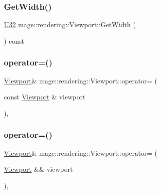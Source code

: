 \subsubsection{\texorpdfstring{Get\+Width()}{GetWidth()}}
{\footnotesize\ttfamily \hyperlink{namespacemage_a41c104c036fba3756a74e19f793eeaa1}{U32} mage\+::rendering\+::\+Viewport\+::\+Get\+Width (\begin{DoxyParamCaption}{ }\end{DoxyParamCaption}) const\hspace{0.3cm}{\ttfamily [noexcept]}}

\hypertarget{classmage_1_1rendering_1_1_viewport_afc42613270537b92aa837455b4c154f0}{}\label{classmage_1_1rendering_1_1_viewport_afc42613270537b92aa837455b4c154f0} 
\subsubsection{\texorpdfstring{operator=()}{operator=()}\hspace{0.1cm}{\footnotesize\ttfamily [1/2]}}
{\footnotesize\ttfamily \hyperlink{classmage_1_1rendering_1_1_viewport}{Viewport}\& mage\+::rendering\+::\+Viewport\+::operator= (\begin{DoxyParamCaption}\item[{const \hyperlink{classmage_1_1rendering_1_1_viewport}{Viewport} \&}]{viewport }\end{DoxyParamCaption})\hspace{0.3cm}{\ttfamily [default]}, {\ttfamily [noexcept]}}

\hypertarget{classmage_1_1rendering_1_1_viewport_a62b0439861e78c3718f2b29339ec7226}{}\label{classmage_1_1rendering_1_1_viewport_a62b0439861e78c3718f2b29339ec7226} 
\subsubsection{\texorpdfstring{operator=()}{operator=()}\hspace{0.1cm}{\footnotesize\ttfamily [2/2]}}
{\footnotesize\ttfamily \hyperlink{classmage_1_1rendering_1_1_viewport}{Viewport}\& mage\+::rendering\+::\+Viewport\+::operator= (\begin{DoxyParamCaption}\item[{\hyperlink{classmage_1_1rendering_1_1_viewport}{Viewport} \&\&}]{viewport }\end{DoxyParamCaption})\hspace{0.3cm}{\ttfamily [default]}, {\ttfamily [noexcept]}}

